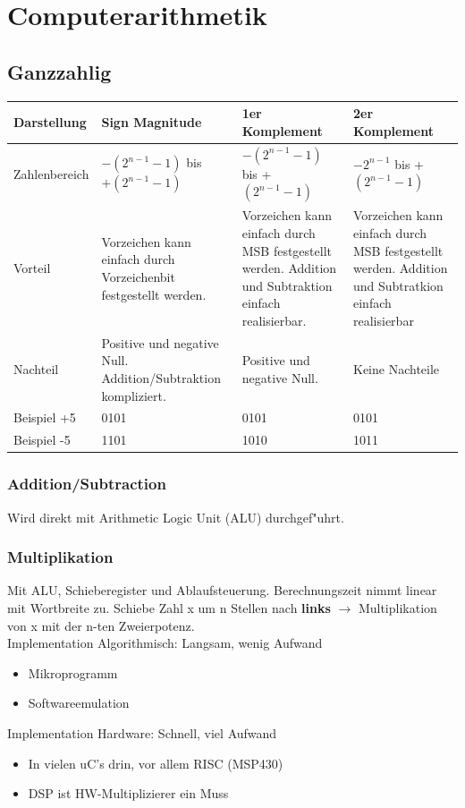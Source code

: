 \section{Computerarithmetik}

\subsection{Ganzzahlig}
\begin{tabular}{|p{3cm}|p{4.5cm}|p{4.5cm}|p{4.5cm}|}
\hline
Darstellung & Sign Magnitude & 1er Komplement & 2er Komplement\\
\hline
Zahlenbereich & $-(2^{n-1}-1)$ bis $+(2^{n-1}-1)$ & $-(2^{n-1}-1)$ bis +$(2^{n-1}-1)$ & $-2^{n-1}$ bis +$(2^{n-1}-1)$\\
\hline
Vorteil & Vorzeichen kann einfach durch Vorzeichenbit festgestellt werden. & Vorzeichen kann einfach durch MSB festgestellt werden. Addition und Subtraktion einfach realisierbar. & Vorzeichen kann einfach durch MSB festgestellt werden. Addition und Subtratkion einfach realisierbar \\ 
\hline
Nachteil & Positive und negative Null. Addition/Subtraktion kompliziert. & Positive und negative Null. & Keine Nachteile\\
\hline
Beispiel +5 & 0101 & 0101 & 0101 \\
Beispiel -5 & 1101 & 1010 & 1011 \\
\hline
\end{tabular}
\subsubsection{Addition/Subtraction}
Wird direkt mit Arithmetic Logic Unit (ALU) durchgef"uhrt.
\subsubsection{Multiplikation}
Mit ALU, Schieberegister und Ablaufsteuerung. Berechnungszeit nimmt linear mit Wortbreite zu. Schiebe Zahl x um n Stellen nach \textbf{links} $\rightarrow$ Multiplikation von x mit der n-ten Zweierpotenz. \\
Implementation Algorithmisch: Langsam, wenig Aufwand
\begin{itemize}
\item Mikroprogramm
\item Softwareemulation
\end{itemize}
Implementation Hardware: Schnell, viel Aufwand\\
\begin{itemize}
\item In vielen uC's drin, vor allem RISC (MSP430)
\item DSP ist HW-Multiplizierer ein Muss
\end{itemize}
